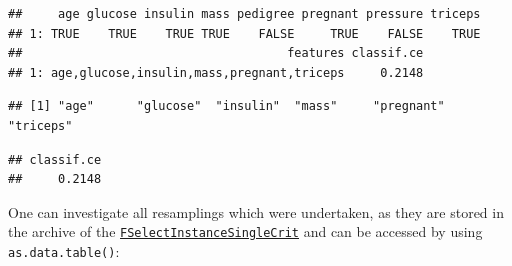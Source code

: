 \documentclass[
]{scrbook}
\newenvironment{Shaded}{\begin{snugshade}}{\end{snugshade}}
\newcommand{\CommentTok}[1]{\textcolor[rgb]{0.56,0.35,0.01}{\textit{#1}}}
\newcommand{\FunctionTok}[1]{\textcolor[rgb]{0.00,0.00,0.00}{#1}}
\newcommand{\NormalTok}[1]{#1}
\newcommand{\SpecialCharTok}[1]{\textcolor[rgb]{0.00,0.00,0.00}{#1}}
\newcommand{\StringTok}[1]{\textcolor[rgb]{0.31,0.60,0.02}{#1}}
\renewenvironment{Shaded} {\begin{snugshade}\small} {\end{snugshade}}
\begin{document}
\begin{Shaded}
\end{Shaded}

\begin{verbatim}
##     age glucose insulin mass pedigree pregnant pressure triceps
## 1: TRUE    TRUE    TRUE TRUE    FALSE     TRUE    FALSE    TRUE
##                                     features classif.ce
## 1: age,glucose,insulin,mass,pregnant,triceps     0.2148
\end{verbatim}

\begin{Shaded}
\end{Shaded}

\begin{verbatim}
## [1] "age"      "glucose"  "insulin"  "mass"     "pregnant" "triceps"
\end{verbatim}

\begin{Shaded}
\end{Shaded}

\begin{verbatim}
## classif.ce 
##     0.2148
\end{verbatim}

One can investigate all resamplings which were undertaken, as they are stored in the archive of the \href{https://mlr3fselect.mlr-org.com/reference/FSelectInstanceSingleCrit.html}{\texttt{FSelectInstanceSingleCrit}} and can be accessed by using \texttt{as.data.table()}:

\begin{Shaded}
\end{Shaded}
\end{document}
